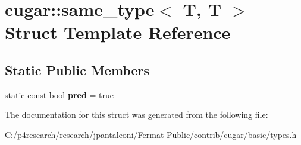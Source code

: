 \hypertarget{structcugar_1_1same__type_3_01_t_00_01_t_01_4}{}\section{cugar\+:\+:same\+\_\+type$<$ T, T $>$ Struct Template Reference}
\label{structcugar_1_1same__type_3_01_t_00_01_t_01_4}
\subsection*{Static Public Members}
\begin{DoxyCompactItemize}
\item 
\mbox{\label{structcugar_1_1same__type_3_01_t_00_01_t_01_4_a56fa964bab60205ea68a324db3b6fdd8}} 
static const bool {\bfseries pred} = true
\end{DoxyCompactItemize}


The documentation for this struct was generated from the following file\+:\begin{DoxyCompactItemize}
\item 
C\+:/p4research/research/jpantaleoni/\+Fermat-\/\+Public/contrib/cugar/basic/types.\+h\end{DoxyCompactItemize}
